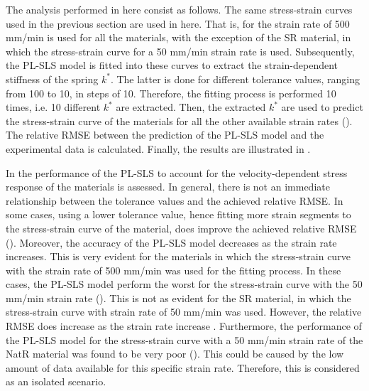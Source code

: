 The analysis performed in here consist as follows. The same stress-strain curves used in the previous section are used in here. That is, for the strain rate of 500 mm/min is used for all the materials, with the exception of the SR material, in which the stress-strain curve for a 50 mm/min strain rate is used. Subsequently, the PL-SLS model is fitted into these curves to extract the strain-dependent stiffness of the spring $k^*$. The latter is done for different tolerance values, ranging from 100 to 10, in steps of 10. Therefore, the fitting process is performed 10 times, i.e. 10 different $k^*$ are extracted. Then, the extracted $k^*$ are used to predict the stress-strain curve of the materials for all the other available strain rates (). The relative RMSE between the prediction of the PL-SLS model and the experimental data is calculated. Finally, the results are illustrated in .

In  the performance of the PL-SLS to account for the velocity-dependent stress response of the materials is assessed. In general, there is not an immediate relationship between the tolerance values and the achieved relative RMSE. In some cases, using a lower tolerance value, hence fitting more strain segments to the stress-strain curve of the material, does improve the achieved relative RMSE (). Moreover, the accuracy of the PL-SLS model decreases as the strain rate increases. This is very evident for the materials in which the stress-strain curve with the strain rate of 500 mm/min was used for the fitting process. In these cases, the PL-SLS model perform the worst for the stress-strain curve with the 50 mm/min strain rate (). This is not as evident for the SR material, in which the stress-strain curve with strain rate of 50 mm/min was used. However, the relative RMSE does increase as the strain rate increase . Furthermore, the performance of the PL-SLS model for the stress-strain curve with a 50 mm/min strain rate of the NatR material was found to be very poor (). This could be caused by the low amount of data available for this specific strain rate. Therefore, this is considered as an isolated scenario.

